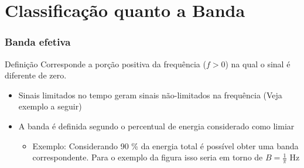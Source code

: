 \documentclass[10pt,hyperref={pdfpagemode=FullScreen},aspectratio=169]{beamer}
\begin{document}
\section{Classificação quanto a Banda}

\begin{frame}
  \frametitle{Banda efetiva}

  \begin{block}{Definição}
    Corresponde a porção positiva da frequência ($f>0$) na qual o sinal é diferente de zero.
  \end{block}

  \begin{itemize}
    \item Sinais limitados no tempo geram sinais não-limitados na frequência (Veja exemplo a seguir)
    \item A banda é definida segundo o percentual de energia considerado como limiar
    \begin{itemize}
      \item  Exemplo: Considerando 90 \% da energia total é possível obter uma banda correspondente. Para o exemplo da figura isso seria em torno de $B = \frac{1}{\pi}$ \si{\hertz}
    \end{itemize}
  \end{itemize}

\end{frame}
\end{document}
